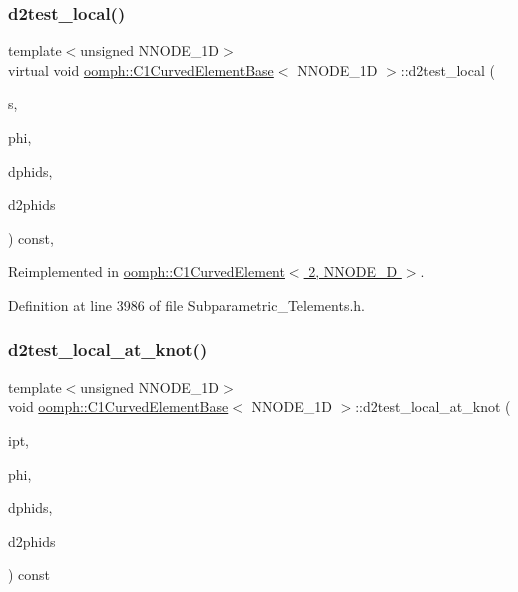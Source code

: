 \subsubsection{\texorpdfstring{d2test\+\_\+local()}{d2test\_local()}}
{\footnotesize\ttfamily template$<$unsigned N\+N\+O\+D\+E\+\_\+1D$>$ \\
virtual void \hyperlink{classoomph_1_1C1CurvedElementBase}{oomph\+::\+C1\+Curved\+Element\+Base}$<$ N\+N\+O\+D\+E\+\_\+1D $>$\+::d2test\+\_\+local (\begin{DoxyParamCaption}\item[{const \hyperlink{classoomph_1_1Vector}{Vector}$<$ double $>$ \&}]{s,  }\item[{\hyperlink{classoomph_1_1Shape}{Shape} \&}]{phi,  }\item[{\hyperlink{classoomph_1_1DShape}{D\+Shape} \&}]{dphids,  }\item[{\hyperlink{classoomph_1_1DShape}{D\+Shape} \&}]{d2phids }\end{DoxyParamCaption}) const\hspace{0.3cm}{\ttfamily [inline]}, {\ttfamily [virtual]}}



Reimplemented in \hyperlink{classoomph_1_1C1CurvedElement_3_012_00_01NNODE__1D_01_4_a17db4cc4715be25a4492c4569d4a8f41}{oomph\+::\+C1\+Curved\+Element$<$ 2, N\+N\+O\+D\+E\+\_\+D $>$}.



Definition at line 3986 of file Subparametric\+\_\+\+Telements.\+h.

\mbox{\label{classoomph_1_1C1CurvedElementBase_a2134f74d95690ebefe22339cd0041a8e}} 
\subsubsection{\texorpdfstring{d2test\+\_\+local\+\_\+at\+\_\+knot()}{d2test\_local\_at\_knot()}}
{\footnotesize\ttfamily template$<$unsigned N\+N\+O\+D\+E\+\_\+1D$>$ \\
void \hyperlink{classoomph_1_1C1CurvedElementBase}{oomph\+::\+C1\+Curved\+Element\+Base}$<$ N\+N\+O\+D\+E\+\_\+1D $>$\+::d2test\+\_\+local\+\_\+at\+\_\+knot (\begin{DoxyParamCaption}\item[{const unsigned \&}]{ipt,  }\item[{\hyperlink{classoomph_1_1Shape}{Shape} \&}]{phi,  }\item[{\hyperlink{classoomph_1_1DShape}{D\+Shape} \&}]{dphids,  }\item[{\hyperlink{classoomph_1_1DShape}{D\+Shape} \&}]{d2phids }\end{DoxyParamCaption}) const\hspace{0.3cm}{\ttfamily [inline]}}

